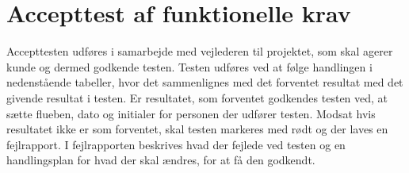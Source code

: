 \section{Accepttest af funktionelle krav}
Accepttesten udføres i samarbejde med vejlederen til projektet, som skal agerer kunde og dermed godkende testen. Testen udføres ved at følge handlingen i nedenstående tabeller, hvor det sammenlignes med det forventet resultat med det givende resultat i testen. Er resultatet, som forventet godkendes testen ved, at sætte flueben, dato og initialer for personen der udfører testen. Modsat hvis resultatet ikke er som forventet, skal testen markeres med rødt og der laves en fejlrapport. I fejlrapporten beskrives hvad der fejlede ved testen og en handlingsplan for hvad der skal ændres, for at få den godkendt. 




